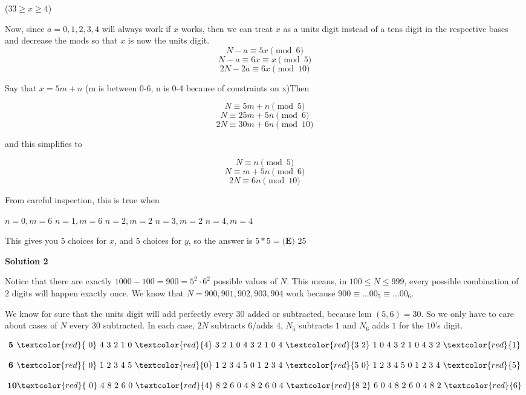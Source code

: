 \begin{enumerate}
 ($33 \ge x \ge 4$)

 Now, since $a=0,1,2,3,4$ will always work if $x$ works, then we can treat $x$ as a units digit instead of a tens digit in the respective bases and decrease the mods so that $x$ is now the units digit.
 \[N - a \equiv 5x \pmod{6}\] 
 \[N - a \equiv 6x \equiv x \pmod{5}\] 
 \[2N - 2a \equiv 6x \pmod{10}\]

 Say that $x=5m+n$ (m is between 0-6, n is 0-4 because of constraints on x)Then 

 
 \[N \equiv 5m+n \pmod{5}\] 
 \[N \equiv 25m+5n \pmod{6}\] 
 \[2N\equiv30m + 6n \pmod{10}\]

 and this simplifies to 

 
 \[N \equiv n \pmod{5}\] 
 \[N \equiv m+5n \pmod{6}\]
 \[2N\equiv 6n \pmod{10}\]

 From careful inspection, this is true when

 $n=0, m=6$
$n=1, m=6$
$n=2, m=2$
$n=3, m=2$
$n=4, m=4$

 This gives you $5$ choices for $x$, and $5$ choices for $y$, so the answer is $5* 5 = \boxed{\textbf{(E) }25}$




\textbf{Solution 2}

Notice that there are exactly $1000-100=900=5^2\cdot 6^2$ possible values of $N$. This means, in $100\le N\le 999$, every possible combination of $2$ digits will happen exactly once. We know that $N=900,901,902,903,904$ work because $900\equiv\dots00_5\equiv\dots00_6$.

 We know for sure that the units digit will add perfectly every $30$ added or subtracted, because $\text{lcm }(5, 6)=30$. So we only have to care about cases of $N$ every $30$ subtracted. In each case, $2N$ subtracts $6$/adds $4$, $N_5$ subtracts $1$ and $N_6$ adds $1$ for the $10$'s digit.

 
 \[\textbf{5 }\textcolor{red}{\text{ 0}}\text{ 4 3 2 1 0 }\textcolor{red}{\text{4}}\text{ 3 2 1 0 4 3 2 1 0 4 }\textcolor{red}{\text{3 2}}\text{ 1 0 4 3 2 1 0 4 3 2 }\textcolor{red}{\text{1}}\]

 \[\textbf{6 }\textcolor{red}{\text{ 0}}\text{ 1 2 3 4 5 }\textcolor{red}{\text{0}}\text{ 1 2 3 4 5 0 1 2 3 4 }\textcolor{red}{\text{5 0}}\text{ 1 2 3 4 5 0 1 2 3 4 }\textcolor{red}{\text{5}}\]

 \[\textbf{10}\textcolor{red}{\text{ 0}}\text{ 4 8 2 6 0 }\textcolor{red}{\text{4}}\text{ 8 2 6 0 4 8 2 6 0 4 }\textcolor{red}{\text{8 2}}\text{ 6 0 4 8 2 6 0 4 8 2 }\textcolor{red}{\text{6}}\]


\end{enumerate}
